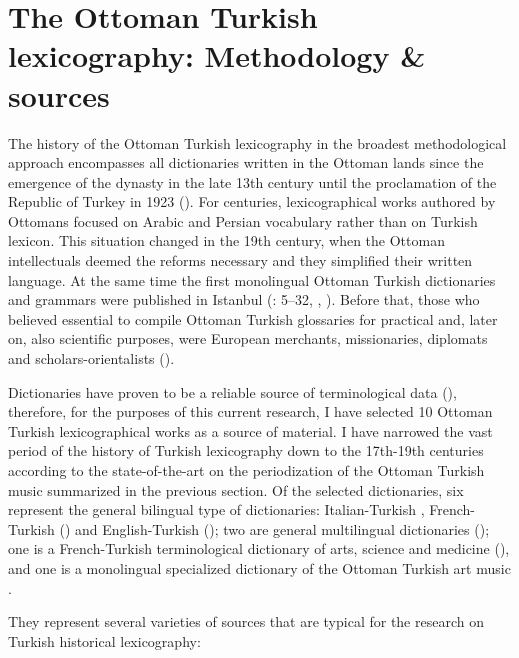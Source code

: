 \documentclass[output=paper,colorlinks,citecolor=brown,arabicfont,chinesefont]{langscibook}
\begin{document}
\section{The Ottoman Turkish lexicography: Methodology \& sources}\label{sec:pawlina:2}

The history of the Ottoman Turkish lexicography in the broadest methodological approach encompasses all dictionaries written in the Ottoman lands since the emergence of the dynasty in the late 13th century until the proclamation of the Republic of Turkey in 1923 (\citealt{Aksan1998, Olmez1994, Prokosch2011}). For centuries, lexicographical works authored by Ottomans focused on Arabic and Persian vocabulary rather than on Turkish lexicon. This situation changed in the 19th century, when the Ottoman intellectuals deemed the reforms necessary and they simplified their written language. At the same time the first monolingual Ottoman Turkish dictionaries and grammars were published in Istanbul (\citealt{Lewis1999}:  5–32, \citealt{Prokosch2013, Siemieniec-golas2015}, \citealt[335]{Stein1990}). Before that, those who believed essential to compile Ottoman Turkish glossaries for practical and, later on, also scientific purposes, were European merchants, missionaries, diplomats and scholars-orientalists (\citealt{Rocchi2011, Schweickard2014, Stachowski1995}).

Dictionaries have proven to be a reliable source of terminological data (\citealt{GalinskiBudin1999, Harras1989, Miodunka1989, Sager1989}), therefore, for the purposes of this current research, I have selected 10 Ottoman Turkish lexicographical works as a source of material. I have narrowed the vast period of the history of Turkish lexicography down to the 17th-19th centuries according to the state-of-the-art on the periodization of the Ottoman Turkish music summarized in the previous section. Of the selected dictionaries, six represent the general bilingual type of dictionaries: Italian-Turkish \citep{Siemieniec-golas2005}, French-Turkish (\citealt{KiefferBianchi1835, Sami1885, Stachowski2002}) and English-Turkish (\citealt{Redhouse1861, RedhouseSozlugu2017}); two are general multilingual dictionaries (\citealt{Korabinsky1788, Meninski1680}); one is a French-Turkish terminological dictionary of arts, science and medicine (\citealt{TinghirSinapian1891}), and one is a monolingual specialized dictionary of the Ottoman Turkish art music \citep{Uz1892}.

They represent several varieties of sources that are typical for the research on Turkish historical lexicography: 
\end{document}
